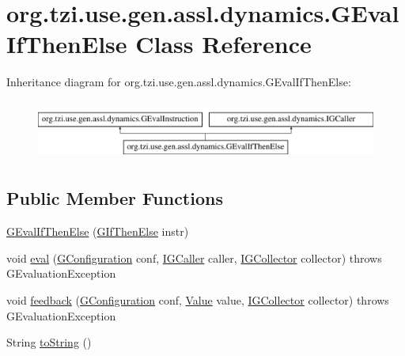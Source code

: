 \hypertarget{classorg_1_1tzi_1_1use_1_1gen_1_1assl_1_1dynamics_1_1_g_eval_if_then_else}{\section{org.\-tzi.\-use.\-gen.\-assl.\-dynamics.\-G\-Eval\-If\-Then\-Else Class Reference}
\label{classorg_1_1tzi_1_1use_1_1gen_1_1assl_1_1dynamics_1_1_g_eval_if_then_else}
}
Inheritance diagram for org.\-tzi.\-use.\-gen.\-assl.\-dynamics.\-G\-Eval\-If\-Then\-Else\-:\begin{figure}[H]
\begin{center}
\leavevmode
\includegraphics[height=1.971831cm]{classorg_1_1tzi_1_1use_1_1gen_1_1assl_1_1dynamics_1_1_g_eval_if_then_else}
\end{center}
\end{figure}
\subsection*{Public Member Functions}
\begin{DoxyCompactItemize}
\item 
\hyperlink{classorg_1_1tzi_1_1use_1_1gen_1_1assl_1_1dynamics_1_1_g_eval_if_then_else_a049a3b880ad771a14a7befc1a65afd8d}{G\-Eval\-If\-Then\-Else} (\hyperlink{classorg_1_1tzi_1_1use_1_1gen_1_1assl_1_1statics_1_1_g_if_then_else}{G\-If\-Then\-Else} instr)
\item 
void \hyperlink{classorg_1_1tzi_1_1use_1_1gen_1_1assl_1_1dynamics_1_1_g_eval_if_then_else_ad3a71d426347e14f3684f997c91159ca}{eval} (\hyperlink{classorg_1_1tzi_1_1use_1_1gen_1_1assl_1_1dynamics_1_1_g_configuration}{G\-Configuration} conf, \hyperlink{interfaceorg_1_1tzi_1_1use_1_1gen_1_1assl_1_1dynamics_1_1_i_g_caller}{I\-G\-Caller} caller, \hyperlink{interfaceorg_1_1tzi_1_1use_1_1gen_1_1assl_1_1dynamics_1_1_i_g_collector}{I\-G\-Collector} collector)  throws G\-Evaluation\-Exception 
\item 
void \hyperlink{classorg_1_1tzi_1_1use_1_1gen_1_1assl_1_1dynamics_1_1_g_eval_if_then_else_add5f0d355ce037431dc01feb4ba87ace}{feedback} (\hyperlink{classorg_1_1tzi_1_1use_1_1gen_1_1assl_1_1dynamics_1_1_g_configuration}{G\-Configuration} conf, \hyperlink{classorg_1_1tzi_1_1use_1_1uml_1_1ocl_1_1value_1_1_value}{Value} value, \hyperlink{interfaceorg_1_1tzi_1_1use_1_1gen_1_1assl_1_1dynamics_1_1_i_g_collector}{I\-G\-Collector} collector)  throws G\-Evaluation\-Exception 
\item 
String \hyperlink{classorg_1_1tzi_1_1use_1_1gen_1_1assl_1_1dynamics_1_1_g_eval_if_then_else_a15b21d3382bc1fb19823c12172010a5c}{to\-String} ()
\end{DoxyCompactItemize}
